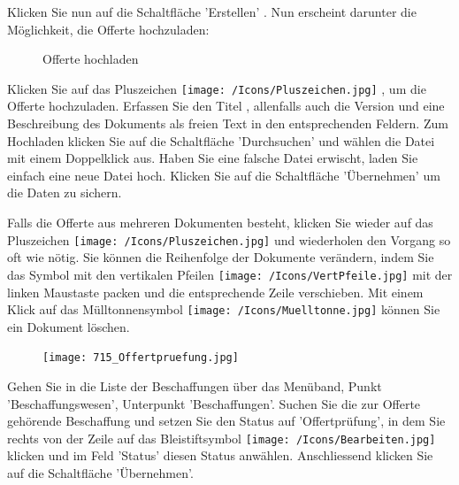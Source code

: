 \vspace{\baselineskip}

Klicken Sie nun auf die Schaltfläche 'Erstellen' . Nun erscheint darunter die Möglichkeit, die Offerte
hochzuladen:

\begin{figure}[H]
\caption{Offerte hochladen}
\end{figure}

Klicken Sie auf das Pluszeichen \texttt{[image: /Icons/Pluszeichen.jpg]} , um die Offerte hochzuladen. Erfassen Sie den Titel , allenfalls auch die Version  und eine Beschreibung  des Dokuments als freien Text in den entsprechenden Feldern. Zum Hochladen klicken Sie auf die Schaltfläche 'Durchsuchen'  und wählen die Datei mit einem Doppelklick aus. Haben Sie eine falsche Datei erwischt, laden Sie einfach eine neue Datei hoch. Klicken Sie auf die Schaltfläche 'Übernehmen'  um die Daten zu sichern.

\vspace{\baselineskip}

Falls die Offerte aus mehreren Dokumenten besteht, klicken Sie wieder auf das Pluszeichen \texttt{[image: /Icons/Pluszeichen.jpg]}  und wiederholen den Vorgang so oft wie nötig. Sie können die Reihenfolge der Dokumente verändern, indem Sie das Symbol mit den vertikalen Pfeilen \texttt{[image: /Icons/VertPfeile.jpg]}  mit der linken Maustaste packen und die entsprechende Zeile verschieben. Mit einem Klick auf das Mülltonnensymbol \texttt{[image: /Icons/Muelltonne.jpg]}  können Sie ein Dokument löschen.

\vspace{\baselineskip}

\begin{figure}
\vspace{-15pt}
\texttt{[image: 715\_Offertpruefung.jpg]}
\end{figure}
Gehen Sie in die Liste der Beschaffungen über das Menüband, Punkt 'Beschaffungswesen', Unterpunkt 'Beschaffungen'. Suchen Sie die zur Offerte gehörende Beschaffung und setzen Sie den Status auf 'Offertprüfung', in dem Sie rechts von der Zeile auf das Bleistiftsymbol \texttt{[image: /Icons/Bearbeiten.jpg]} klicken und im Feld 'Status' diesen Status anwählen. Anschliessend klicken Sie auf die Schaltfläche 'Übernehmen'.

